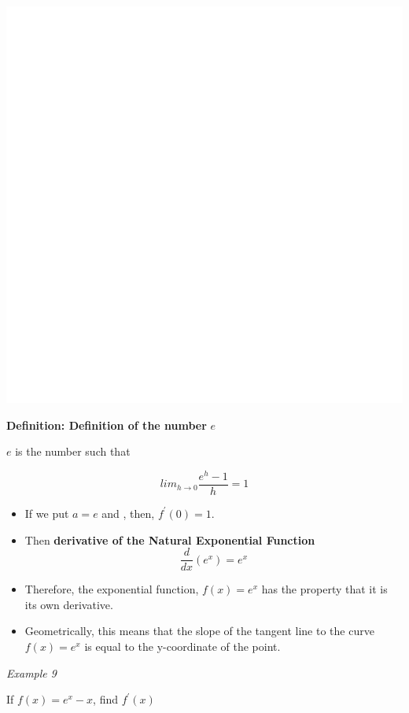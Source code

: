 \documentclass[]{book}
\begin{document}
\begin{center}\includegraphics[width=1\linewidth]{figure/LB14-1} \end{center}

\textbf{Definition: Definition of the number} \(e\)

\(e\) is the number such that

\[lim_{h\to 0}\frac{e^h -1}{h}=1\]

\begin{itemize}
\item
  If we put \(a=e\) and , then, \(f^\prime(0)=1\).
\item
  Then \textbf{derivative of the Natural Exponential Function}
  \[\frac{d}{dx}(e^x)= e^x\]
\item
  Therefore, the exponential function, \(f(x) = e^x\) has the property that it is its own derivative.
\item
  Geometrically, this means that the slope of the tangent line to the curve \(f(x) = e^x\) is equal to the y-coordinate of the point.
\end{itemize}

\emph{Example 9}

If \(f(x)=e^x-x\), find \(f^\prime(x)\)
\end{document}
